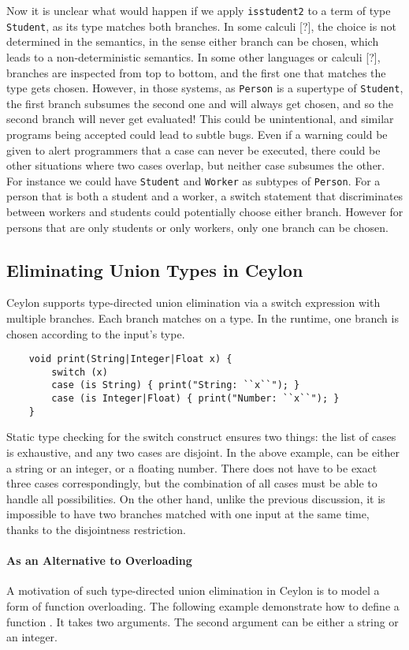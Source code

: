 \noindent Now it is unclear what would happen if we apply \lstinline{isstudent2}
to a term of type \lstinline{Student}, as its type matches both branches. In some
calculi [?], the choice is not determined in the semantics, in the sense either
branch can be chosen, which leads to a non-deterministic semantics. In some
other languages or calculi [?], branches are inspected from top to bottom, and the first one
that matches the type gets chosen. However, in those systems, as
\lstinline{Person} is a supertype of \lstinline{Student}, the first branch
subsumes the second one and will always get chosen, and so the second branch
will never get evaluated! This could be unintentional, and similar programs  
being accepted could lead to subtle bugs. Even if a warning could be given
to alert programmers that a case can never be executed, there could be
other situations where two cases overlap, but neither case subsumes the other.
For instance we could have \lstinline{Student} and \lstinline{Worker} as
subtypes of \lstinline{Person}. For a person that is both a student and a worker,
a switch statement that discriminates between workers and students could
potentially choose either branch. However for persons that are only students
or only workers, only one branch can be chosen.

\subsection{Eliminating Union Types in Ceylon}
Ceylon supports type-directed union elimination via a switch expression with
multiple branches. Each branch matches on a type.
In the runtime, one branch is chosen according to the input's type.
\begin{lstlisting}
	void print(String|Integer|Float x) {
		switch (x)
		case (is String) { print("String: ``x``"); }
		case (is Integer|Float) { print("Number: ``x``"); }
	}
\end{lstlisting}
%
Static type checking for the switch construct ensures two things: the 
list of cases is exhaustive, and any two cases are disjoint.
In the above example,  can be either a string or an integer,
or a floating number. There does not have to be exact three cases correspondingly,
but the combination of all cases must be able to handle all possibilities.
On the other hand, unlike the previous discussion, it is impossible to have two
branches matched with one input at the same time, thanks to the disjointness
restriction.

\paragraph{As an Alternative to Overloading}
A motivation of such type-directed union elimination in Ceylon is to
model a form of function overloading.
The following example demonstrate how to define a function .
It takes two arguments. The second argument can be either a string or
an integer.

